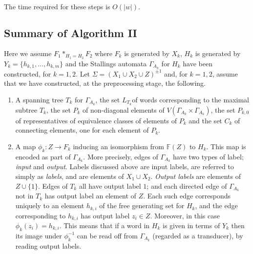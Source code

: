 \documentclass[a4paper,12pt]{article}
\newcommand{\G}{\Gamma }
\renewcommand{\S}{\Sigma }
\numberwithin{equation}{section}
\numberwithin{figure}{section}
\newcommand{\FF}{\ensuremath{\mathbb{F}}}
\newcommand{\maps}{\rightarrow}
\newcommand{\be}{\begin{enumerate}}
\newcommand{\ee}{\end{enumerate}}
\begin{document}
\begin{comp}
The time required for these steps is $O(|w|)$.
\end{comp}
\subsection{Summary of Algorithm II}\label{sub:summaryII}

Here we assume $F_1*_{H_1=H_2} F_2$
 where $F_k$ is generated by $X_k$, $H_k$ is generated
by $Y_k=\{h_{k,1},\ldots, h_{k,m}\}$
and the Stallings automata $\G_{A_k}$ for $H_k$ have
been constructed, for $k=1,2$. Let  $\S=(X_1\cup X_2\cup Z)^{\pm 1}$ and, for $k=1,2$,
assume that we have constructed, at the preprocessing stage, the following.
\be
\item
A spanning tree  $T_k$ for $\G_{A_k}$,
 the set $L_{T_k}$of words corresponding to the  maximal subtree $T_k$,
the set $P_k$ of non-diagonal elements of
$V( \G_{A_k}\times \G_{A_k})$,
 the set $P_{k,0}$ of representatives  of equivalence classes of
elements of $P_k$ and the
set $C_k$ of connecting elements, one for each element of $P_k$.
\item A map $\phi_k:Z\maps F_k$  inducing an isomorphism from $\FF(Z)$ to
$H_k$. This map is encoded as part of $\G_{A_k}$. More precisely,
edges of $\G_{A_k}$ have two types of label; \emph{input} and \emph{output}.
Labels discussed above are input labels, are
referred to simply as \emph{labels}, and are elements of $X_1\cup X_2$.
\emph{Output labels} are elements of  $Z\cup \{1\}$.
 Edges of $T_k$  all have output label $1$; and each directed
edge of $\G_{A_k}$ not in $T_k$ has output
label an element of $Z$. Each such edge corresponds uniquely to
 an element $h_{k,i}$ of the free generating set for $H_k$, and the edge
corresponding to $h_{k,i}$ has
 output label  $z_i\in Z$. Moreover, in this case $\phi_k(z_i)=h_{k,i}$.
  This means that if a word in $H_k$ is given in terms of $Y_k$  then its
image under $\phi_k^{-1}$ can be read off from $\G_{A_k}$ (regarded as a
 transducer), by reading output labels.
\ee
\end{document}
